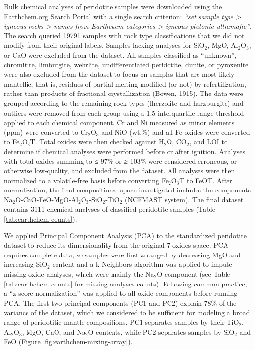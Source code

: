 \documentclass[draft,linenumbers]{agujournal2018}
\begin{document}
Bulk chemical analyses of peridotite samples were downloaded using the Earthchem.org Search Portal with a single search criterion: \emph{``set sample type \textgreater{} igneous rocks \textgreater{} names from Earthchem categories \textgreater{} igneous-plutonic-ultramafic''}. The search queried 19791 samples with rock type classifications that we did not modify from their original labels. Samples lacking analyses for SiO\(_2\), MgO, Al\(_2\)O\(_3\), or CaO were excluded from the dataset. All samples classified as ``unknown'', chromitite, limburgite, wehrlite, undifferentiated peridotite, dunite, or pyroxenite were also excluded from the dataset to focus on samples that are most likely mantellic, that is, residues of partial melting modified (or not) by refertilization, rather than products of fractional crystallization (Bowen, 1915). The data were grouped according to the remaining rock types (lherzolite and harzburgite) and outliers were removed from each group using a 1.5 interquartile range threshold applied to each chemical component. Cr and Ni measured as minor elements (ppm) were converted to Cr\(_2\)O\(_3\) and NiO (wt.\%) and all Fe oxides were converted to Fe\(_2\)O\(_3\)T. Total oxides were then checked against H\(_2\)O, CO\(_2\), and LOI to determine if chemical analyses were performed before or after ignition. Analyses with total oxides summing to ≤ 97\% or ≥ 103\% were considered erroneous, or otherwise low-quality, and excluded from the dataset. All analyses were then normalized to a volatile-free basis before converting Fe\(_2\)O\(_3\)T to FeOT. After normalization, the final compositional space investigated includes the components Na\(_2\)O-CaO-FeO-MgO-Al\(_2\)O\(_3\)-SiO\(_2\)-TiO\(_2\) (NCFMAST system). The final dataset contains 3111 chemical analyses of classified peridotite samples (Table \ref{tab:earthchem-counts}).

We applied Principal Component Analysis (PCA) to the standardized peridotite dataset to reduce its dimensionality from the original 7-oxides space. PCA requires complete data, so samples were first arranged by decreasing MgO and increasing SiO\(_2\) content and a k-Neighbors algorithm was applied to impute missing oxide analyses, which were mainly the Na\(_2\)O component (see Table \ref{tab:earthchem-counts} for missing analyses counts). Following common practice, a ``z-score normalization'' was applied to all oxide components before running PCA. The first two principal components (PC1 and PC2) explain 78\% of the variance of the dataset, which we considered to be sufficient for modeling a broad range of peridotitic mantle compositions. PC1 separates samples by their TiO\(_2\), Al\(_2\)O\(_3\), MgO, CaO, and Na\(_2\)O contents, while PC2 separates samples by SiO\(_2\) and FeO (Figure \ref{fig:earthchem-mixing-array}).
\end{document}
